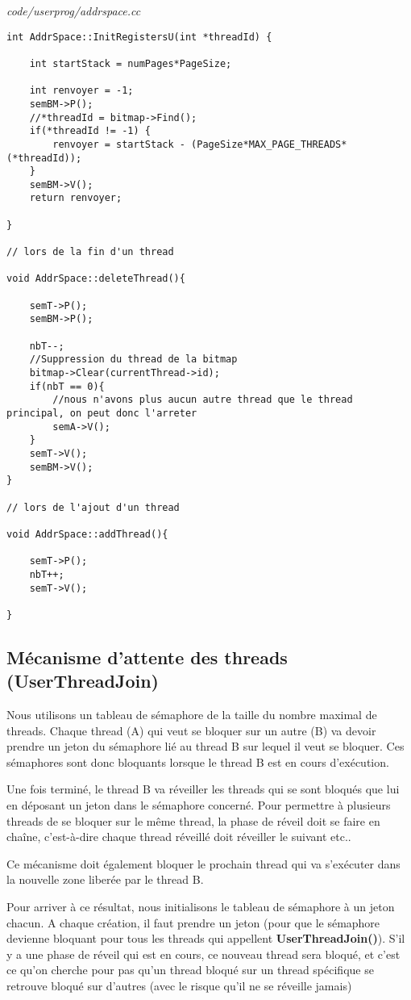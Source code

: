 \documentclass[a4paper,10pt]{article}
\begin{document}
\textit{code/userprog/addrspace.cc}
\begin{lstlisting}
int AddrSpace::InitRegistersU(int *threadId) {
    
    int startStack = numPages*PageSize;

    int renvoyer = -1;
    semBM->P();   
    //*threadId = bitmap->Find();
    if(*threadId != -1) {
        renvoyer = startStack - (PageSize*MAX_PAGE_THREADS*(*threadId));
    }
    semBM->V();
    return renvoyer;

}

// lors de la fin d'un thread

void AddrSpace::deleteThread(){

    semT->P();
    semBM->P();

    nbT--;
    //Suppression du thread de la bitmap
    bitmap->Clear(currentThread->id);
    if(nbT == 0){
        //nous n'avons plus aucun autre thread que le thread principal, on peut donc l'arreter
        semA->V();
    }
    semT->V();
    semBM->V();
}

// lors de l'ajout d'un thread

void AddrSpace::addThread(){

    semT->P();
    nbT++;
    semT->V();
  
}
\end{lstlisting}

\subsection{Mécanisme d'attente des threads (UserThreadJoin)}

Nous utilisons un tableau de sémaphore de la taille du nombre maximal de threads.
Chaque thread (A) qui veut se bloquer sur un autre (B) va devoir prendre un jeton
du sémaphore lié au thread B sur lequel il veut se bloquer. Ces sémaphores sont
donc bloquants lorsque le thread B est en cours d'exécution.

Une fois terminé, le thread B va réveiller les threads qui se sont bloqués que
lui en déposant un jeton dans le sémaphore concerné.
Pour permettre à plusieurs threads de se bloquer sur le même thread, la phase
de réveil doit se faire en chaîne, c'est-à-dire chaque thread réveillé doit
réveiller le suivant etc..

Ce mécanisme doit également bloquer le prochain thread qui va s'exécuter dans
la nouvelle zone liberée par le thread B.

Pour arriver à ce résultat, nous initialisons le tableau de sémaphore à un jeton
chacun. A chaque création, il faut prendre un jeton (pour que le sémaphore
devienne bloquant pour tous les threads qui appellent \textbf{UserThreadJoin()}).
S'il y a une phase de réveil qui est en cours, ce nouveau thread sera bloqué,
et c'est ce qu'on cherche pour pas qu'un thread bloqué sur un thread spécifique
se retrouve bloqué sur d'autres (avec le risque qu'il ne se réveille jamais)
\end{document}
